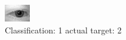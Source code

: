 \begin{figure}[h!]
\begin{center}
\includegraphics[width=0.60\columnwidth]{figures/ID442_class_1_target_2.png}
\end{center}
\caption{ Classification: 1 actual target: 2}
\label{fig:ID442_class_1_target_2}
\end{figure}
